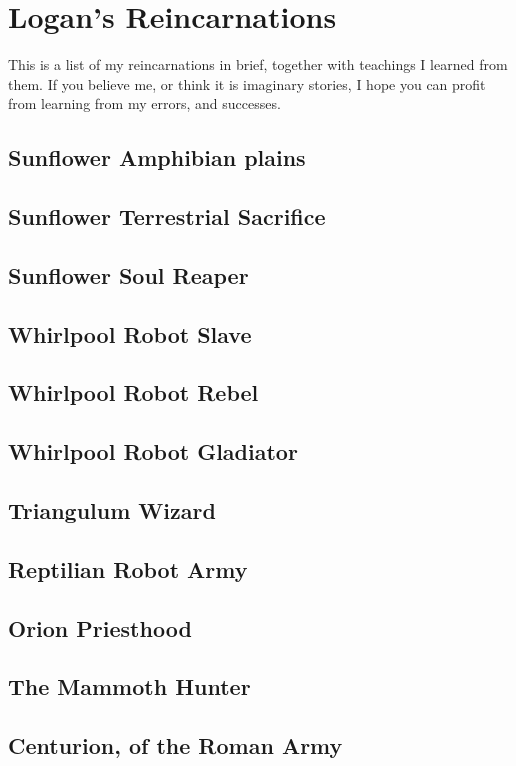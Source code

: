 \part{Logan's Reincarnations}
\label{reincarnation}

This is a list of my reincarnations in brief, together with teachings I learned
from them. 
If you believe me, or think it is imaginary stories, 
I hope you can profit from learning from my errors, and successes.

\chapter{Sunflower Amphibian plains}
\chapter{Sunflower Terrestrial Sacrifice}
\chapter{Sunflower Soul Reaper}
\chapter{Whirlpool Robot Slave}
\chapter{Whirlpool Robot Rebel}
\chapter{Whirlpool Robot Gladiator}
\chapter{Triangulum Wizard}
\chapter{Reptilian Robot Army}
\chapter{Orion Priesthood}
\chapter{The Mammoth Hunter}
\chapter{Centurion, of the Roman Army}

